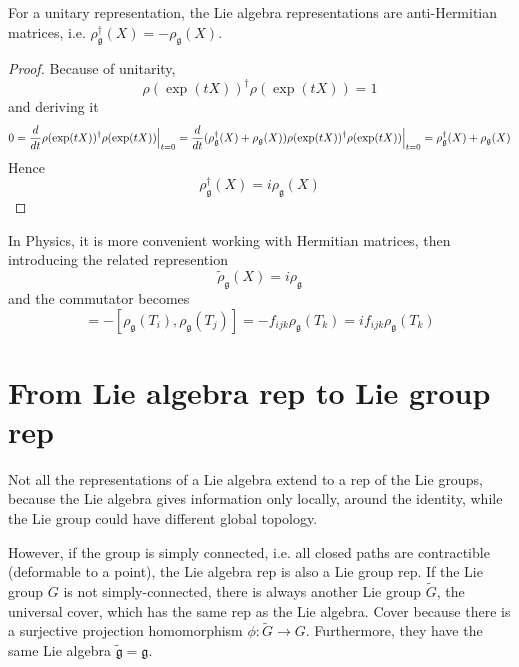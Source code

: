     For a unitary representation, the Lie algebra representations are anti-Hermitian matrices, i.e. $\rho_{\mathfrak g}^\dagger (X) = - \rho_{\mathfrak g} (X)$. 

    \begin{proof}
        Because of unitarity, 
        \begin{equation*}
            \rho(\exp(tX))^\dagger \rho(\exp(tX)) = 1
        \end{equation*}
        and deriving it 
        \begin{equation*}
            0 = \frac{d}{dt} \rho(\exp(tX))^\dagger \rho(\exp(tX))\Big \vert_{t=0} = \frac{d}{dt} (\rho_{\mathfrak g}^\dagger (X) + \rho_{\mathfrak g} (X)) \rho(\exp(tX))^\dagger \rho(\exp(tX))\Big \vert_{t=0} = \rho_{\mathfrak g}^\dagger (X) + \rho_{\mathfrak g} (X)
        \end{equation*}
        Hence 
        \begin{equation*}
            \rho_{\mathfrak g}^\dagger (X) = i \rho_{\mathfrak g} (X)
        \end{equation*}
    \end{proof}

    In Physics, it is more convenient working with Hermitian matrices, then introducing the related represention 
    \begin{equation*}
        \tilde \rho_{\mathfrak g} (X) = i \rho_{\mathfrak g} 
    \end{equation*}
    and the commutator becomes 
    \begin{equation*}
        [\tilde \rho_{\mathfrak g} (T_i), \tilde \rho_{\mathfrak g} (T_j)] = - [ \rho_{\mathfrak g} (T_i), \rho_{\mathfrak g} (T_j)] = - f_{ijk} \rho_{\mathfrak g} (T_k) = i f_{ijk} \rho_{\mathfrak g} (T_k)
    \end{equation*}

\section{From Lie algebra rep to Lie group rep}

    Not all the representations of a Lie algebra extend to a rep of the Lie groups, because the Lie algebra gives information only locally, around the identity, while the Lie group could have different global topology. 

    However, if the group is simply connected, i.e. all closed paths are contractible (deformable to a point), the Lie algebra rep is also a Lie group rep. If the Lie group $G$ is not simply-connected, there is always another Lie group $\tilde G$, the universal cover, which has the same rep as the Lie algebra. Cover because there is a surjective projection homomorphism $\phi \colon \tilde G \rightarrow G$. Furthermore, they have the same Lie algebra $\tilde{\mathfrak g} = \mathfrak g$. 

